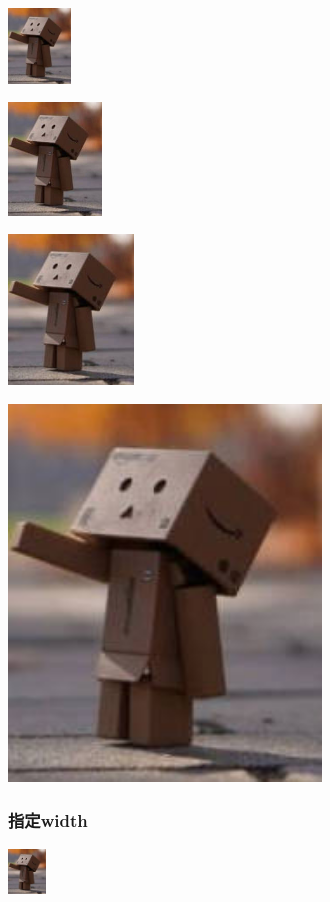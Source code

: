 \documentclass{article}
\begin{document}
	\includegraphics[height=2cm]{test.jpg}
	
	\includegraphics[height=3cm]{test.jpg}
	
	\includegraphics[height=4cm]{test.jpg}
	
	\includegraphics[height=10cm]{test.jpg}
	\subsubsection{指定width}
	
	\includegraphics[width=1cm]{test.jpg}
	
\end{document}
